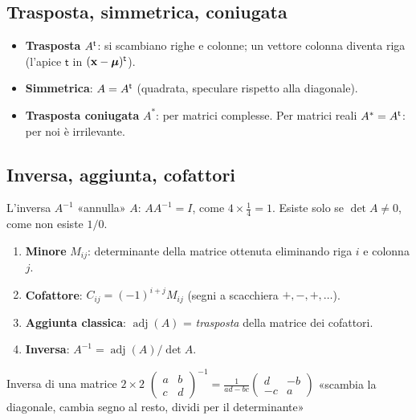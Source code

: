 \subsection{Trasposta, simmetrica, coniugata}
\begin{itemize}
  \item \textbf{Trasposta} $A^{\mathsf{t}}$: si scambiano righe e colonne; un vettore colonna diventa riga (l'apice $\mathsf{t}$ in $(\mathbf{x}-\bm{\mu})^{\mathsf{t}}$).
  \item \textbf{Simmetrica}: $A=A^{\mathsf{t}}$ (quadrata, speculare rispetto alla diagonale).
  \item \textbf{Trasposta coniugata} $A^*$: per matrici complesse. Per matrici reali $A^*=A^{\mathsf{t}}$: per noi è irrilevante.
\end{itemize}

\subsection{Inversa, aggiunta, cofattori}
\begin{intuizione}
L'inversa $A^{-1}$ «annulla» $A$: $AA^{-1}=I$, come $4\times\frac14=1$. Esiste solo se $\det A\neq0$, come non esiste $1/0$.
\end{intuizione}
\begin{tecnica}
\begin{enumerate}
  \item \textbf{Minore} $M_{ij}$: determinante della matrice ottenuta eliminando riga $i$ e colonna $j$.
  \item \textbf{Cofattore}: $C_{ij}=(-1)^{i+j}M_{ij}$ (segni a scacchiera $+,-,+,\dots$).
  \item \textbf{Aggiunta classica}: $\operatorname{adj}(A)$ = \emph{trasposta} della matrice dei cofattori.
  \item \textbf{Inversa}: $A^{-1}=\operatorname{adj}(A)/\det A$.
\end{enumerate}
\end{tecnica}
\begin{formulat}{Inversa di una matrice $2\times2$}
$\displaystyle \begin{pmatrix}a&b\\c&d\end{pmatrix}^{-1}=\frac{1}{ad-bc}\begin{pmatrix}d&-b\\-c&a\end{pmatrix}$
\qquad «scambia la diagonale, cambia segno al resto, dividi per il determinante»
\end{formulat}
